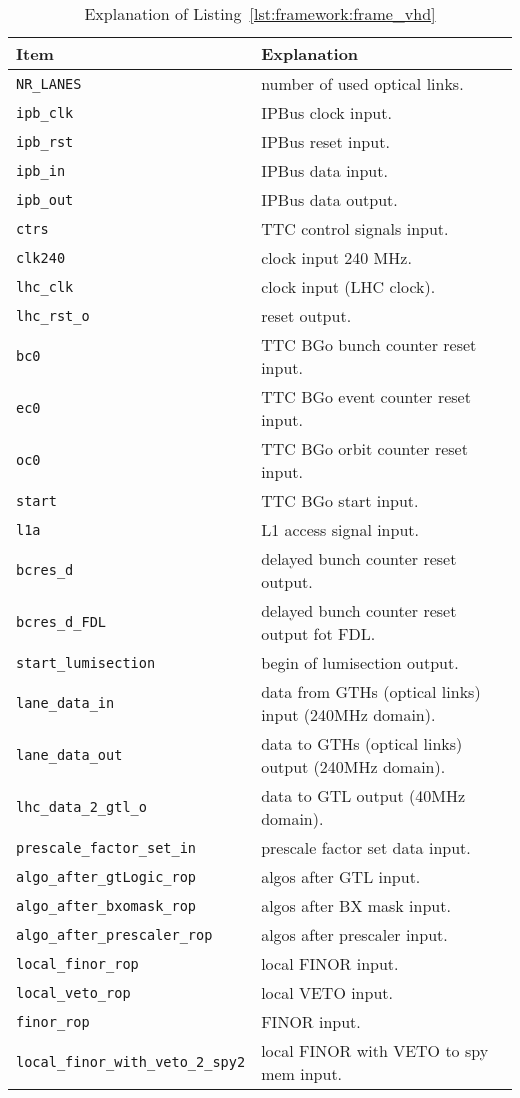 \clearpage

\medskip
\begin{table}
\footnotesize
\caption{Explanation of Listing~\ref{lst:framework:frame_vhd}}
\vspace{5mm}
\centering
\begin{tabular}{l p{}}
\toprule
{Item} & {Explanation}\\
\midrule
\verb|NR_LANES| & number of used optical links.\\
\verb|ipb_clk| & IPBus clock input.\\
\verb|ipb_rst| & IPBus reset input.\\
\verb|ipb_in| & IPBus data input.\\
\verb|ipb_out| & IPBus data output.\\
\verb|ctrs| & TTC control signals input.\\
\verb|clk240| & clock input 240 MHz.\\
\verb|lhc_clk| & clock input (LHC clock).\\
\verb|lhc_rst_o| & reset output.\\
\verb|bc0| & TTC BGo bunch counter reset input.\\
\verb|ec0| & TTC BGo event counter reset input.\\
\verb|oc0| & TTC BGo orbit counter reset input.\\
\verb|start| & TTC BGo start input.\\
\verb|l1a| & L1 access signal input.\\
\verb|bcres_d| & delayed bunch counter reset output.\\
\verb|bcres_d_FDL| & delayed bunch counter reset output fot FDL.\\
\verb|start_lumisection| & begin of lumisection output.\\
\verb|lane_data_in| & data from GTHs (optical links) input (240MHz domain).\\
\verb|lane_data_out| & data to GTHs (optical links) output (240MHz domain).\\
\verb|lhc_data_2_gtl_o| & data to GTL output (40MHz domain).\\
\verb|prescale_factor_set_in| & prescale factor set data input.\\
\verb|algo_after_gtLogic_rop| & algos after GTL input.\\
\verb|algo_after_bxomask_rop| & algos after BX mask input.\\
\verb|algo_after_prescaler_rop| & algos after prescaler input.\\
\verb|local_finor_rop| & local FINOR input.\\
\verb|local_veto_rop| & local VETO input.\\
\verb|finor_rop| & FINOR input.\\
\verb|local_finor_with_veto_2_spy2| & local FINOR with VETO to spy mem input.\\
\bottomrule
\end{tabular}
\label{tab:framework:explanation_frame_vhd}
\end{table}

